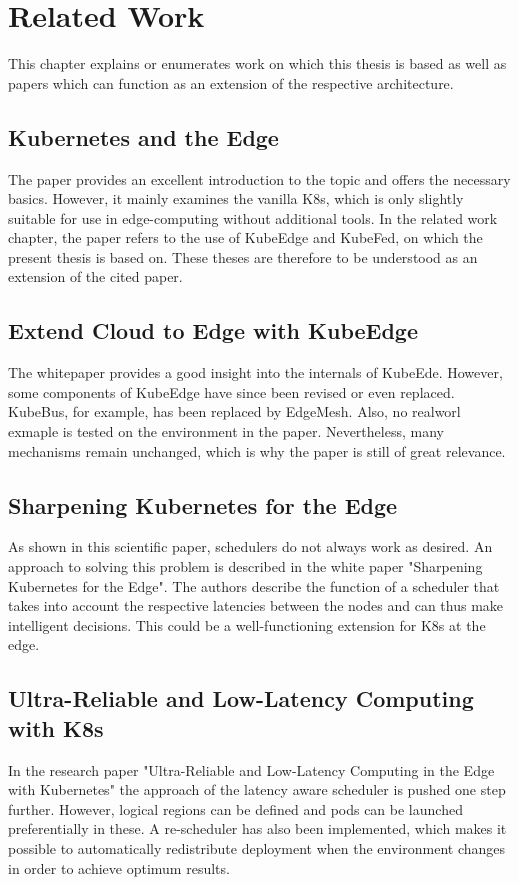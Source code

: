 \documentclass[MSC,Master,english]{twbook}%
\begin{document}
\chapter{Related Work}
\label{chap:related}
This chapter explains or enumerates work on which this thesis is based as well as papers which can function as an extension of the respective architecture.

\section{Kubernetes and the Edge}
The paper\cite{hal-kubeedge} provides an excellent introduction to the topic and offers the necessary basics. However, it mainly examines the vanilla \ac{K8s}, which is only slightly suitable for use in edge-computing without additional tools. In the related work chapter, the paper refers to the use of KubeEdge and KubeFed, on which the present thesis is based on. These theses are therefore to be understood as an extension of the cited paper.

\section{Extend Cloud to Edge with KubeEdge}
The whitepaper\cite{kubedge} provides a good insight into the internals of KubeEde. However, some components of KubeEdge have since been revised or even replaced. KubeBus, for example, has been replaced by EdgeMesh. Also, no realworl exmaple is tested on the environment in the paper. Nevertheless, many mechanisms remain unchanged, which is why the paper is still of great relevance.

\section{Sharpening Kubernetes for the Edge}
\label{sec:sharp-k8s-edge}
As shown in this scientific paper, schedulers do not always work as desired. An approach to solving this problem is described in the white paper "Sharpening Kubernetes for the Edge"\cite{k8s-sharping-edge}. The authors describe the function of a scheduler that takes into account the respective latencies between the nodes and can thus make intelligent decisions. This could be a well-functioning extension for K8s at the edge.


\section{Ultra-Reliable and Low-Latency Computing with K8s}
\label{sec:ultra-low-k8s}
In the research paper "Ultra-Reliable and Low-Latency Computing in the Edge with Kubernetes"\cite{k8s-latency-sched} the approach of the latency aware scheduler is pushed one step further. However, logical regions can be defined and pods can be launched preferentially in these. A re-scheduler has also been implemented, which makes it possible to automatically redistribute deployment when the environment changes in order to achieve optimum results.
\end{document}
